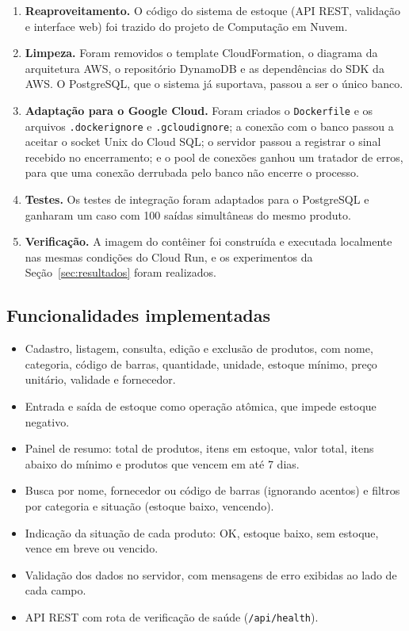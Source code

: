 \documentclass[12pt,a4paper]{article}
\newcommand{\arq}[1]{\texttt{#1}}
\begin{document}
\begin{enumerate}
  \item \textbf{Reaproveitamento.} O código do sistema de estoque (API REST, validação e
        interface web) foi trazido do projeto de Computação em Nuvem.
  \item \textbf{Limpeza.} Foram removidos o template CloudFormation, o diagrama da arquitetura
        AWS, o repositório DynamoDB e as dependências do SDK da AWS. O PostgreSQL, que o
        sistema já suportava, passou a ser o único banco.
  \item \textbf{Adaptação para o Google Cloud.} Foram criados o \arq{Dockerfile} e os arquivos
        \arq{.dockerignore} e \arq{.gcloudignore}; a conexão com o banco passou a aceitar o
        socket Unix do Cloud SQL; o servidor passou a registrar o sinal recebido no encerramento;
        e o pool de conexões ganhou um tratador de erros, para que uma conexão derrubada pelo
        banco não encerre o processo.
  \item \textbf{Testes.} Os testes de integração foram adaptados para o PostgreSQL e ganharam
        um caso com 100 saídas simultâneas do mesmo produto.
  \item \textbf{Verificação.} A imagem do contêiner foi construída e executada localmente
        nas mesmas condições do Cloud Run, e os experimentos da Seção~\ref{sec:resultados}
        foram realizados.
\end{enumerate}

\subsection{Funcionalidades implementadas}

\begin{itemize}
  \item Cadastro, listagem, consulta, edição e exclusão de produtos, com nome, categoria,
        código de barras, quantidade, unidade, estoque mínimo, preço unitário, validade e
        fornecedor.
  \item Entrada e saída de estoque como operação atômica, que impede estoque negativo.
  \item Painel de resumo: total de produtos, itens em estoque, valor total, itens abaixo do
        mínimo e produtos que vencem em até 7 dias.
  \item Busca por nome, fornecedor ou código de barras (ignorando acentos) e filtros por
        categoria e situação (estoque baixo, vencendo).
  \item Indicação da situação de cada produto: OK, estoque baixo, sem estoque, vence em breve
        ou vencido.
  \item Validação dos dados no servidor, com mensagens de erro exibidas ao lado de cada campo.
  \item API REST com rota de verificação de saúde (\texttt{/api/health}).
\end{itemize}
\end{document}
